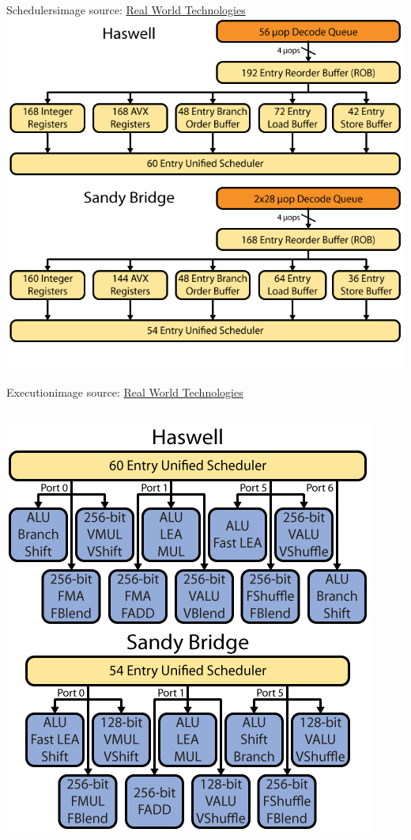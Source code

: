 \documentclass[mathserif,xcolor={dvipsnames,table}]{beamer}
\begin{document}
\begin{frame}{Schedulers\hfill\tiny{image source: \href{http://realworldtech.com}{Real World Technologies}}}
\includegraphics[scale=.42]{images/haswell-2.png}
\end{frame}

\begin{frame}{Execution\hfill\tiny{image source: \href{http://realworldtech.com}{Real World Technologies}}}
\begin{columns}
\begin{column}{.5\textwidth}
\hfill\includegraphics[scale=.45]{images/haswell-3.png}
\end{column}
\end{columns}
\end{frame}
\end{document}
